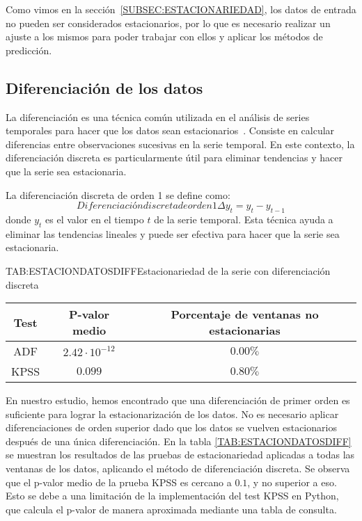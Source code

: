 Como vimos en la sección~\ref{SUBSEC:ESTACIONARIEDAD}, los datos de entrada no pueden ser considerados estacionarios, por lo que es necesario realizar un ajuste a los mismos para poder trabajar con ellos y aplicar los métodos de predicción.

\subsection{Diferenciación de los datos}

La diferenciación es una técnica común utilizada en el análisis de series temporales para hacer que los datos sean estacionarios~\cite{box2015time}. Consiste en calcular diferencias entre observaciones sucesivas en la serie temporal. En este contexto, la diferenciación discreta es particularmente útil para eliminar tendencias y hacer que la serie sea estacionaria.

La diferenciación discreta de orden 1 se define como:
\begin{equation}{Diferenciación discreta de orden 1}    
    \Delta y_t = y_t - y_{t-1}
\end{equation}
donde \( y_t \) es el valor en el tiempo \( t \) de la serie temporal. Esta técnica ayuda a eliminar las tendencias lineales y puede ser efectiva para hacer que la serie sea estacionaria.

\begin{table}[Estacionariedad de la serie con diferenciación discreta]{TAB:ESTACIONDATOSDIFF}{Estacionariedad de la serie con diferenciación discreta}
    \begin{tabular}{|c|c|c|}
        \hline
        \textbf{Test} & \textbf{P-valor medio} & \textbf{Porcentaje de ventanas no estacionarias} \\
        \hline
        ADF & $2.42\cdot 10^{-12}$ & $0.00\%$ \\
        KPSS & $0.099$ & $0.80\%$ \\
        \hline
    \end{tabular}
\end{table}

En nuestro estudio, hemos encontrado que una diferenciación de primer orden es suficiente para lograr la estacionarización de los datos. No es necesario aplicar diferenciaciones de orden superior dado que los datos se vuelven estacionarios después de una única diferenciación. En la tabla \ref{TAB:ESTACIONDATOSDIFF} se muestran los resultados de las pruebas de estacionariedad aplicadas a todas las ventanas de los datos, aplicando el método de diferenciación discreta. Se observa que el p-valor medio de la prueba KPSS es cercano a $0.1$, y no superior a eso. Esto se debe a una limitación de la implementación del test KPSS en Python, que calcula el p-valor de manera aproximada mediante una tabla de consulta. 

